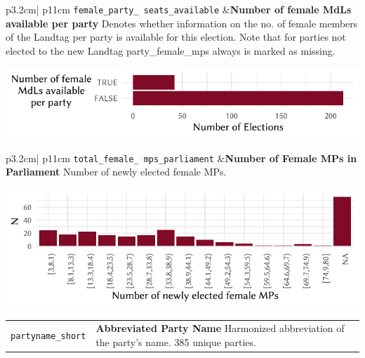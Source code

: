 \documentclass[
]{scrartcl}
\begin{document}
\begin{longtable}{p{3.2cm}| p{11cm}}
\texttt{female\_party\_
seats\_available} &\textbf{Number of female MdLs available per party}\newline 
Denotes whether information on the no. of female members of the Landtag per party is available for this election. Note that for parties not elected to the new Landtag party\_female\_mps always is marked as missing.

\hspace*{.25cm}
\begin{minipage}[t]{\linewidth }
\vspace{0pt}
\includegraphics[width = \linewidth]{cbfiles/fpsaplot.pdf}
\end{minipage}


\end{longtable}

\begin{longtable}{p{3.2cm}| p{11cm}}
\texttt{total\_female\_
mps\_parliament} &\textbf{Number of Female MPs in Parliament}\newline 
Number of newly elected female MPs.

\hspace*{.25cm}
\begin{minipage}[t]{\linewidth }
\vspace{0pt}
\includegraphics[width = \linewidth]{cbfiles/totfemmpsplot.pdf}
\end{minipage}


\end{longtable}

\begin{longtable}{p{3.2cm}| p{11cm}}
\texttt{partyname\_short} &\textbf{Abbreviated Party Name}\newline 
Harmonized abbreviation of the party's name. 385 unique parties.
\end{longtable}
\end{document}
